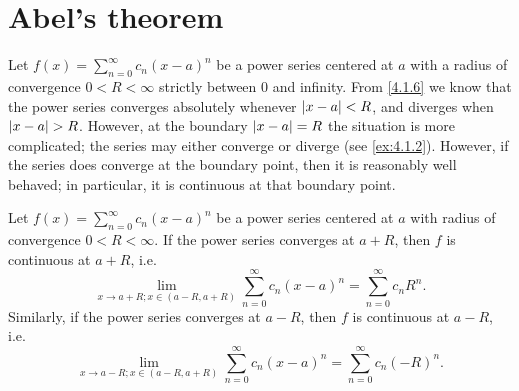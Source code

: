\section{Abel's theorem}\label{sec:4.3}

\begin{note}
  Let \(f(x) = \sum_{n = 0}^\infty c_n (x - a)^n\) be a power series centered at \(a\) with a radius of convergence \(0 < R < \infty\) strictly between \(0\) and infinity.
  From \cref{4.1.6} we know that the power series converges absolutely whenever \(\left\lvert x - a\right\rvert < R\), and diverges when \(\left\lvert x - a\right\rvert > R\).
  However, at the boundary \(\left\lvert x - a\right\rvert = R\) the situation is more complicated;
  the series may either converge or diverge (see \cref{ex:4.1.2}).
  However, if the series does converge at the boundary point, then it is reasonably well behaved;
  in particular, it is continuous at that boundary point.
\end{note}

\begin{thm}\label{4.3.1}
  Let \(f(x) = \sum_{n = 0}^\infty c_n (x - a)^n\) be a power series centered at \(a\) with radius of convergence \(0 < R < \infty\).
  If the power series converges at \(a + R\), then \(f\) is continuous at \(a + R\), i.e.
  \[
    \lim_{x \to a + R ; x \in (a - R, a + R)} \sum_{n = 0}^\infty c_n (x - a)^n = \sum_{n = 0}^\infty c_n R^n.
  \]
  Similarly, if the power series converges at \(a - R\), then \(f\) is continuous at \(a - R\), i.e.
  \[
    \lim_{x \to a - R ; x \in (a - R, a + R)} \sum_{n = 0}^\infty c_n (x - a)^n = \sum_{n = 0}^\infty c_n (-R)^n.
  \]
\end{thm}

